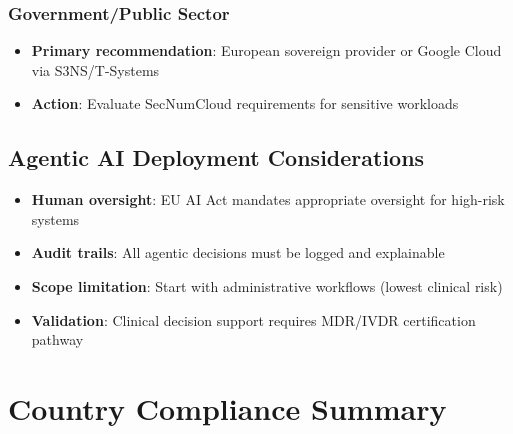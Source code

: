 \documentclass[11pt,a4paper]{article}
\begin{document}
\subsubsection{Government/Public Sector}
\begin{itemize}
    \item \textbf{Primary recommendation}: European sovereign provider or Google Cloud via S3NS/T-Systems
    \item \textbf{Action}: Evaluate SecNumCloud requirements for sensitive workloads
\end{itemize}

\subsection{Agentic AI Deployment Considerations}

\begin{itemize}
    \item \textbf{Human oversight}: EU AI Act mandates appropriate oversight for high-risk systems
    \item \textbf{Audit trails}: All agentic decisions must be logged and explainable
    \item \textbf{Scope limitation}: Start with administrative workflows (lowest clinical risk)
    \item \textbf{Validation}: Clinical decision support requires MDR/IVDR certification pathway
\end{itemize}

\section{Country Compliance Summary}
\end{document}
